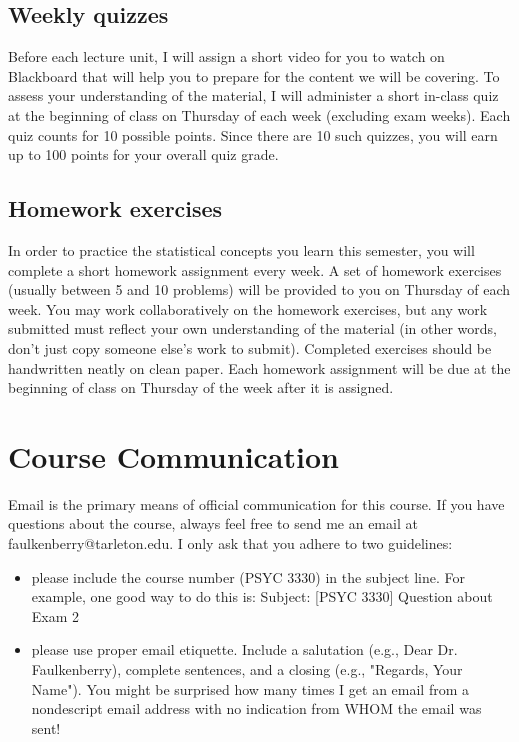 \documentclass[10pt]{article}
\begin{document}
\subsection*{Weekly quizzes}
\label{sec:orge46fb02}
Before each lecture unit, I will assign a short video for you to watch on Blackboard that will help you to prepare for the content we will be covering. To assess your understanding of the material, I will administer a short in-class quiz at the beginning of class on Thursday of each week (excluding exam weeks). Each quiz counts for 10 possible points.  Since there are 10 such quizzes, you will earn up to 100 points for your overall quiz grade.

\subsection*{Homework exercises}
\label{sec:org5ce08b7}
In order to practice the statistical concepts you learn this semester, you will complete a short homework assignment every week.  A set of homework exercises (usually between 5 and 10 problems) will be provided to you on Thursday of each week.  You may work collaboratively on the homework exercises, but any work submitted must reflect your own understanding of the material (in other words, don't just copy someone else's work to submit).  Completed exercises should be handwritten neatly on clean paper.  Each homework assignment will be due at the beginning of class on Thursday of the week after it is assigned.

\section*{Course Communication}
\label{sec:org31c8696}

Email is the primary means of official communication for this course.  If you have questions about the course, always feel free to send me an email at faulkenberry@tarleton.edu.  I only ask that you adhere to two guidelines:
\begin{itemize}
\item please include the course number (PSYC 3330) in the subject line.  For example, one good way to do this is:  Subject: [PSYC 3330] Question about Exam 2
\item please use proper email etiquette.  Include a salutation (e.g., Dear Dr. Faulkenberry), complete sentences, and a closing (e.g., "Regards, Your Name").  You might be surprised how many times I get an email from a nondescript email address with no indication from WHOM the email was sent!
\end{itemize}
\end{document}
